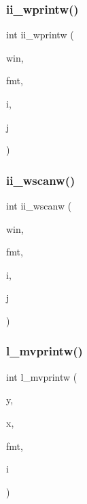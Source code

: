 \mbox{\label{C-macros_8c_ab8f1d3103aca01f9fdbbf7017ecf968b}} 
\subsubsection{\texorpdfstring{ii\+\_\+wprintw()}{ii\_wprintw()}}
{\footnotesize\ttfamily int ii\+\_\+wprintw (\begin{DoxyParamCaption}\item[{W\+I\+N\+D\+OW $\ast$}]{win,  }\item[{const char $\ast$}]{fmt,  }\item[{int}]{i,  }\item[{int}]{j }\end{DoxyParamCaption})}

\mbox{\label{C-macros_8c_a4cca36c361fd3bcc48fdb5d0b723d765}} 
\subsubsection{\texorpdfstring{ii\+\_\+wscanw()}{ii\_wscanw()}}
{\footnotesize\ttfamily int ii\+\_\+wscanw (\begin{DoxyParamCaption}\item[{W\+I\+N\+D\+OW $\ast$}]{win,  }\item[{char $\ast$}]{fmt,  }\item[{int $\ast$}]{i,  }\item[{int $\ast$}]{j }\end{DoxyParamCaption})}

\mbox{\label{C-macros_8c_a958fd7e4d13c3ae6f4a8c249309d6b10}} 
\subsubsection{\texorpdfstring{l\+\_\+mvprintw()}{l\_mvprintw()}}
{\footnotesize\ttfamily int l\+\_\+mvprintw (\begin{DoxyParamCaption}\item[{int}]{y,  }\item[{int}]{x,  }\item[{const char $\ast$}]{fmt,  }\item[{long}]{i }\end{DoxyParamCaption})}

